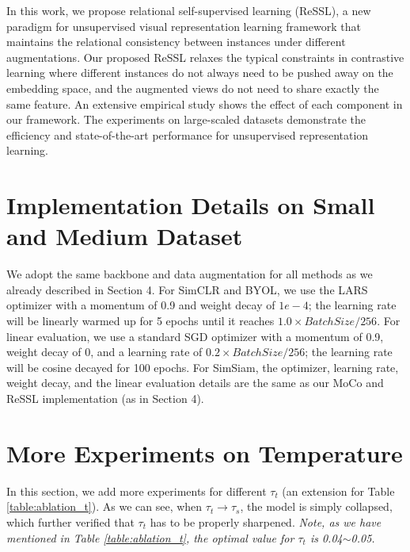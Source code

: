 \documentclass{article}
\newcommand{\<}{\left\langle}
\renewcommand{\>}{\right\rangle}
\begin{document}
In this work, we propose relational self-supervised learning (ReSSL), a new paradigm for unsupervised visual representation learning framework that maintains the relational consistency between instances under different augmentations. Our proposed ReSSL relaxes the typical constraints in contrastive learning where different instances do not always need to be pushed away on the embedding space, and the augmented views do not need to share exactly the same feature. An extensive empirical study shows the effect of each component in our framework. The experiments on large-scaled datasets demonstrate the efficiency and state-of-the-art performance for unsupervised representation learning. 
{\small


}





\newpage
\appendix
\section{Implementation Details on Small and Medium Dataset}
We adopt the same backbone and data augmentation for all methods as we already described in Section 4. For SimCLR and BYOL, we use the LARS optimizer with a momentum of 0.9 and weight decay of $1e-4$; the learning rate will be linearly warmed up for 5 epochs until it reaches $1.0 \times BatchSize/256$. For linear evaluation, we use a standard SGD optimizer with a momentum of 0.9, weight decay of 0, and a learning rate of $0.2 \times BatchSize / 256$; the learning rate will be cosine decayed for 100 epochs. For SimSiam, the optimizer, learning rate, weight decay, and the linear evaluation details are the same as our MoCo and ReSSL implementation (as in Section 4).



\section{More Experiments on Temperature}
In this section, we add more experiments for different $\tau_t$ (an extension for Table \ref{table:ablation_t}). As we can see, when $\tau_t \rightarrow \tau_s$, the model is simply collapsed, which further verified that $\tau_t$ has to be properly sharpened. \emph{Note, as we have mentioned in Table \ref{table:ablation_t}, the optimal value for $\tau_t$ is 0.04$\sim$0.05.}  
\end{document}
